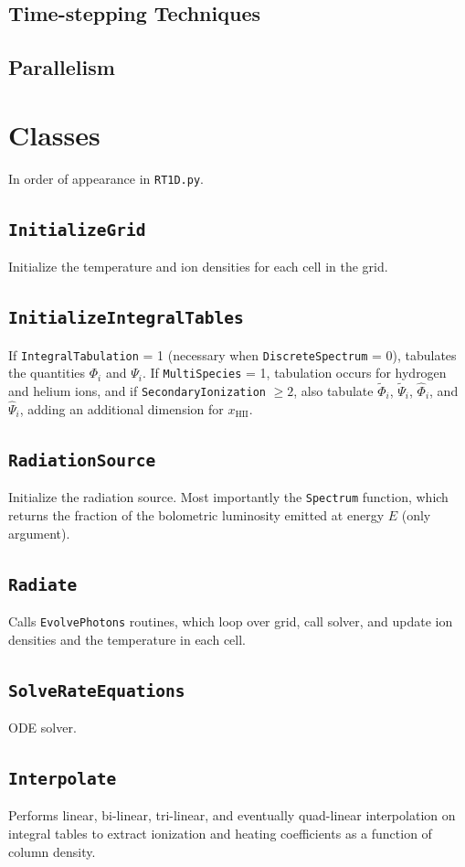 \documentclass[letterpaper,titlepage,12pt]{article}
\numberwithin{equation}{section}
\begin{document}
\subsection{Time-stepping Techniques}



\subsection{Parallelism}

\section{Classes}
In order of appearance in \texttt{RT1D.py}.

\subsection{\texttt{InitializeGrid}}
Initialize the temperature and ion densities for each cell in the grid.
\subsection{\texttt{InitializeIntegralTables}}
If \texttt{IntegralTabulation} = 1 (necessary when \texttt{DiscreteSpectrum} = 0), tabulates the quantities $\Phi_i$ and $\Psi_i$.  If \texttt{MultiSpecies} = 1, tabulation occurs for hydrogen and helium ions, and if \texttt{SecondaryIonization} $\ge 2$, also tabulate $\widetilde{\Phi}_i$, $\widetilde{\Psi}_i$, $\widehat{\Phi}_i$, and $\widehat{\Psi}_i$, adding an additional dimension for $x_{\mathrm{HII}}$.
\subsection{\texttt{RadiationSource}}
Initialize the radiation source.  Most importantly the \texttt{Spectrum} function, which returns the fraction of the bolometric luminosity emitted at energy $E$ (only argument).
\subsection{\texttt{Radiate}}
Calls \texttt{EvolvePhotons} routines, which loop over grid, call solver, and update ion densities and the temperature in each cell.
\subsection{\texttt{SolveRateEquations}}
ODE solver.
\subsection{\texttt{Interpolate}}
Performs linear, bi-linear, tri-linear, and eventually quad-linear interpolation on integral tables to extract ionization and heating coefficients as a function of column density.
\end{document}
